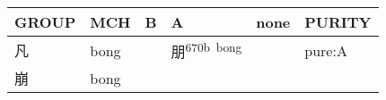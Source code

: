 \documentclass[14pt,a4paper]{scrartcl}
\begin{document}
\begin{longtable}[c]{@{}llllll@{}}
\toprule
\begin{minipage}[b]{0.14\columnwidth}\raggedright\strut
GROUP
\strut\end{minipage} &
\begin{minipage}[b]{0.14\columnwidth}\raggedright\strut
MCH
\strut\end{minipage} &
\begin{minipage}[b]{0.14\columnwidth}\raggedright\strut
B
\strut\end{minipage} &
\begin{minipage}[b]{0.14\columnwidth}\raggedright\strut
A
\strut\end{minipage} &
\begin{minipage}[b]{0.14\columnwidth}\raggedright\strut
none
\strut\end{minipage} &
\begin{minipage}[b]{0.14\columnwidth}\raggedright\strut
PURITY
\strut\end{minipage}\tabularnewline
\midrule
\endhead
\begin{minipage}[t]{0.14\columnwidth}\raggedright\strut
凡
\strut\end{minipage} &
\begin{minipage}[t]{0.14\columnwidth}\raggedright\strut
bong
\strut\end{minipage} &
\begin{minipage}[t]{0.14\columnwidth}\raggedright\strut
\strut\end{minipage} &
\begin{minipage}[t]{0.14\columnwidth}\raggedright\strut
朋\textsuperscript{670b~bong}
\strut\end{minipage} &
\begin{minipage}[t]{0.14\columnwidth}\raggedright\strut
\strut\end{minipage} &
\begin{minipage}[t]{0.14\columnwidth}\raggedright\strut
pure:A
\strut\end{minipage}\tabularnewline
\begin{minipage}[t]{0.14\columnwidth}\raggedright\strut
崩
\strut\end{minipage} &
\begin{minipage}[t]{0.14\columnwidth}\raggedright\strut
bong
\strut\end{minipage} &
\begin{minipage}[t]{0.14\columnwidth}\raggedright\strut
\strut\end{minipage} &
\begin{minipage}[t]{0.14\columnwidth}\raggedright\strut

\end{minipage}
\end{longtable}
\end{document}
